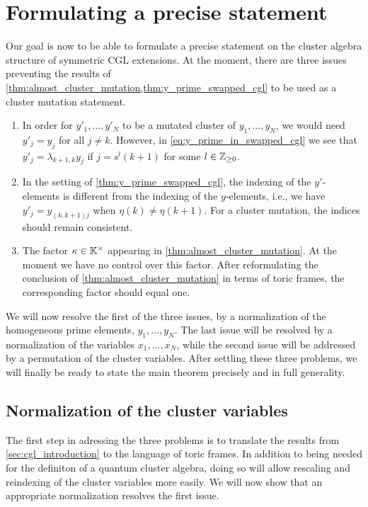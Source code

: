 \section{Formulating a precise statement}\label{sec:formulating_theorem}

Our goal is now to be able to formulate a precise statement on the cluster algebra
structure of symmetric CGL extensions. At the moment, there are three issues preventing
the results of \cref{thm:almost_cluster_mutation,thm:y_prime_swapped_cgl} to be used as
a cluster mutation statement.

\begin{enumerate}
	\item In order for $y'_1, \dots, y'_N$ to be a mutated cluster of $y_1, \dots, y_N$, we would
	      need $y'_j = y_j$ for all $j \neq k$. However, in \cref{eq:y_prime_in_swapped_cgl} we
	      see that $y'_j = \lambda_{k+1,k}y_j$ if $j = s^l(k+1)$ for some $l \in \mathbb{Z}_{\geq 0}$.
	\item In the setting of \cref{thm:y_prime_swapped_cgl}, the indexing of the $y'$-elements is
	      different from the indexing of the $y$-elements, i.e., we have $y'_j = y_{(k,k+1)j}$
	      when $\eta(k) \neq \eta(k+1)$. For a cluster mutation, the indices should remain
	      consistent.
	\item The factor $\kappa \in \mathbb{K}^\times$ appearing in \cref{thm:almost_cluster_mutation}. At
	      the moment we have no control over this factor. After reformulating the conclusion of
	      \cref{thm:almost_cluster_mutation} in terms of toric frames, the corresponding factor
	      should equal one.
\end{enumerate}

We will now resolve the first of the three issues, by a normalization of the
homogeneous prime elements, $y_1, \dots, y_N$. The last issue will be resolved by a
normalization of the variables $x_1, \dots, x_N$, while the second issue will be
addressed by a permutation of the cluster variables. After settling these three
problems, we will finally be ready to state the main theorem precisely and in full
generality.

\subsection{Normalization of the cluster variables}

The first step in adressing the three problems is to translate the results from
\cref{sec:cgl_introduction} to the language of toric frames. In addition to being
needed for the definiton of a quantum cluster algebra, doing so will allow rescaling
and reindexing of the cluster variables more easily. We will now show that an
appropriate normalization resolves the first issue.

